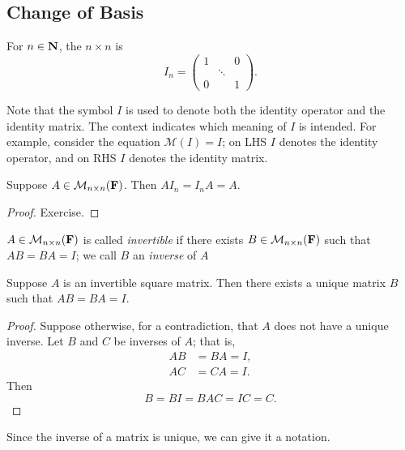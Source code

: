 \subsection{Change of Basis}
\begin{definition}
For $n\in\mathbf N$, the $n\times n$  is
\[I_n=\begin{pmatrix}
1&&0\\
&\ddots&\\
0&&1
\end{pmatrix}.\]
\end{definition}

\begin{remark}
Note that the symbol $I$ is used to denote both the identity operator and the identity matrix. The context indicates which meaning of $I$ is intended. For example, consider the equation $\mathcal{M}(I)=I$; on LHS $I$ denotes the identity operator, and on RHS $I$ denotes the identity matrix.
\end{remark}

\begin{proposition}
Suppose $A\in\mathcal{M}_{n\times n}(\mathbf F)$. Then $AI_n=I_nA=A$.
\end{proposition}

\begin{proof}
Exercise.
\end{proof}

\begin{definition}
$A\in\mathcal{M}_{n\times n}(\mathbf F)$ is called \emph{invertible} if there exists $B\in\mathcal{M}_{n\times n}(\mathbf F)$ such that $AB=BA=I$; we call $B$ an \emph{inverse} of $A$
\end{definition}

\begin{proposition}
Suppose $A$ is an invertible square matrix. Then there exists a unique matrix $B$ such that $AB=BA=I$.
\end{proposition}

\begin{proof}
Suppose otherwise, for a contradiction, that $A$ does not have a unique inverse. Let $B$ and $C$ be inverses of $A$; that is,
\begin{align*}
AB&=BA=I,\\
AC&=CA=I.
\end{align*}
Then 
\[B=BI=BAC=IC=C.\]
\end{proof}

Since the inverse of a matrix is unique, we can give it a notation.

